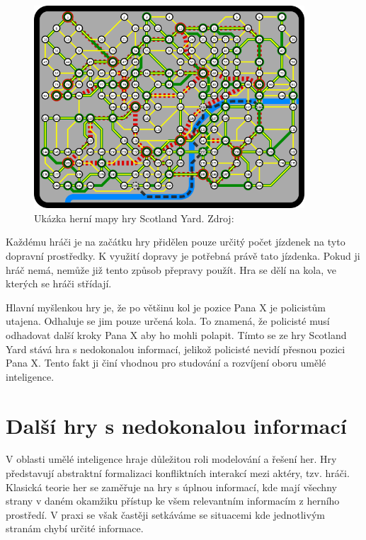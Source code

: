 \begin{figure}[hbt]
	\centering
	\includegraphics[width=0.9\textwidth]{obrazky-figures/scotland_original.png}
	\caption{Ukázka herní mapy hry Scotland Yard.
  Zdroj:\cite{scotland_original_image}}
\end{figure}

Každému hráči je na začátku hry přidělen pouze určitý počet jízdenek na tyto dopravní prostředky.
K využití dopravy je potřebná právě tato jízdenka.
Pokud ji hráč nemá, nemůže již tento způsob přepravy použít.
Hra se dělí na kola, ve kterých se hráči střídají.

Hlavní myšlenkou hry je, že po většinu kol je pozice Pana X je policistům utajena.
Odhaluje se jim pouze určená kola.
To znamená, že policisté musí odhadovat další kroky Pana X aby ho mohli polapit.
Tímto se ze hry Scotland Yard stává hra s nedokonalou informací, jelikož policisté nevidí přesnou pozici Pana X.
Tento fakt ji činí vhodnou pro studování a rozvíjení oboru umělé inteligence.



\section{Další hry s nedokonalou informací}
V oblasti umělé inteligence hraje důležitou roli modelování a řešení her.
Hry představují abstraktní formalizaci konfliktních interakcí mezi aktéry, tzv. hráči.
Klasická teorie her se zaměřuje na hry s úplnou informací, kde mají všechny strany v daném okamžiku přístup ke všem relevantním informacím z herního prostředí.
V praxi se však častěji setkáváme se situacemi kde jednotlivým stranám chybí určité informace.


